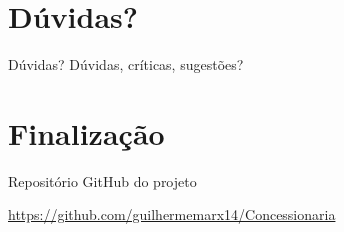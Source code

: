 \documentclass[10pt,brazil]{beamer}
\begin{document}
\section{Dúvidas?}
\begin{frame}{Dúvidas?}
Dúvidas, críticas, sugestões?
\end{frame}

\section{Finalização}

\begin{frame}{Repositório GitHub do projeto}
	
	\href{https://github.com/guilhermemarx14/Concessionaria}{https://github.com/guilhermemarx14/Concessionaria}
	
\end{frame}


	
\end{document}
